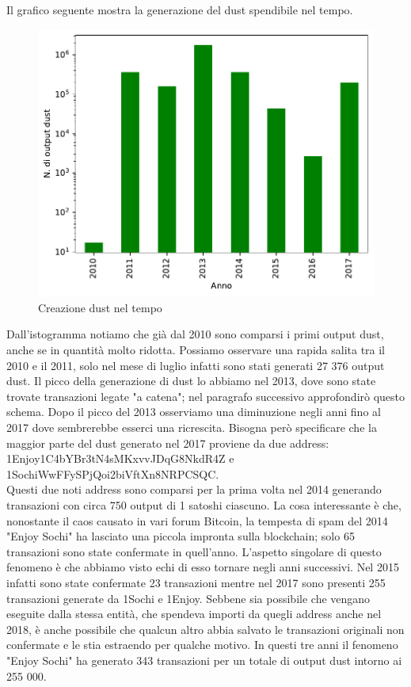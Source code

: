 Il grafico seguente mostra la generazione del dust spendibile nel tempo.
\begin{figure}[h!]
    \centering
    \includegraphics[scale=0.9]{Grafici/dust_created_year.pdf}
    \caption{Creazione dust nel tempo}
    \label{fig:dust_created}
\end{figure}
\FloatBarrier 
Dall'istogramma notiamo che già dal 2010 sono comparsi i primi output dust, anche se in quantità molto ridotta. Possiamo osservare una rapida salita tra il 2010 e il 2011, solo nel mese di luglio infatti sono stati generati 27 376 output dust.
Il picco della generazione di dust lo abbiamo nel 2013, dove sono state trovate transazioni legate "a catena"; nel paragrafo successivo approfondirò questo schema. Dopo il picco del 2013 osserviamo una diminuzione negli anni fino al 2017 dove sembrerebbe esserci una ricrescita. Bisogna però specificare che la maggior parte del dust generato nel 2017 proviene da due address: 1Enjoy1C4bYBr3tN4sMKxvvJDqG8NkdR4Z e 1SochiWwFFySPjQoi2biVftXn8NRPCSQC.\\Questi due noti address sono comparsi per la prima volta nel 2014 generando transazioni con circa 750 output di 1 satoshi ciascuno. La cosa interessante è che, nonostante il caos causato in vari forum Bitcoin, la tempesta di spam del 2014 "Enjoy Sochi" ha lasciato una piccola impronta sulla blockchain; solo 65 transazioni sono state confermate in quell'anno. L'aspetto singolare di questo fenomeno è che abbiamo visto echi di esso tornare negli anni successivi. Nel 2015 infatti sono state confermate 23 transazioni mentre nel 2017 sono presenti 255 transazioni generate da 1Sochi e 1Enjoy. Sebbene sia possibile che vengano eseguite dalla stessa entità, che spendeva importi da quegli address anche nel 2018, è anche possibile che qualcun altro abbia salvato le transazioni originali non confermate e le stia estraendo per qualche motivo. In questi tre anni il fenomeno "Enjoy Sochi" ha generato 343 transazioni per un totale di output dust intorno ai 255 000.\\\\
